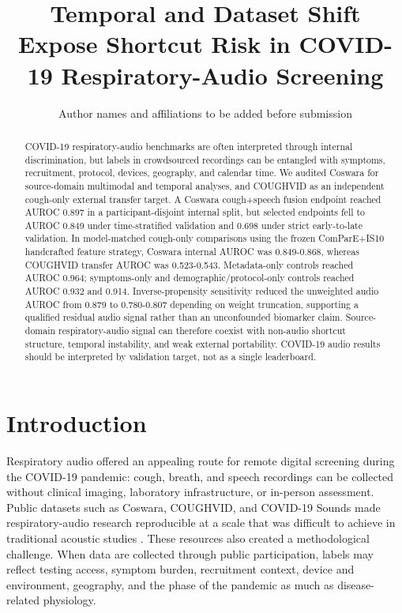 \documentclass[11pt]{article}
\title{Temporal and Dataset Shift Expose Shortcut Risk in COVID-19 Respiratory-Audio Screening}
\author{Author names and affiliations to be added before submission}
\date{}
\begin{document}
\maketitle

\begin{abstract}
COVID-19 respiratory-audio benchmarks are often interpreted through internal discrimination, but labels in crowdsourced recordings can be entangled with symptoms, recruitment, protocol, devices, geography, and calendar time. We audited Coswara for source-domain multimodal and temporal analyses, and COUGHVID as an independent cough-only external transfer target. A Coswara cough+speech fusion endpoint reached AUROC 0.897 in a participant-disjoint internal split, but selected endpoints fell to AUROC 0.849 under time-stratified validation and 0.698 under strict early-to-late validation. In model-matched cough-only comparisons using the frozen ComParE+IS10 handcrafted feature strategy, Coswara internal AUROC was 0.849-0.868, whereas COUGHVID transfer AUROC was 0.523-0.543. Metadata-only controls reached AUROC 0.964; symptoms-only and demographic/protocol-only controls reached AUROC 0.932 and 0.914. Inverse-propensity sensitivity reduced the unweighted audio AUROC from 0.879 to 0.780-0.807 depending on weight truncation, supporting a qualified residual audio signal rather than an unconfounded biomarker claim. Source-domain respiratory-audio signal can therefore coexist with non-audio shortcut structure, temporal instability, and weak external portability. COVID-19 audio results should be interpreted by validation target, not as a single leaderboard.
\end{abstract}

\section*{Introduction}

Respiratory audio offered an appealing route for remote digital screening during the COVID-19 pandemic: cough, breath, and speech recordings can be collected without clinical imaging, laboratory infrastructure, or in-person assessment. Public datasets such as Coswara, COUGHVID, and COVID-19 Sounds made respiratory-audio research reproducible at a scale that was difficult to achieve in traditional acoustic studies \citep{bhattacharya2023coswara,orlandic2021coughvid,xia2021covid}. These resources also created a methodological challenge. When data are collected through public participation, labels may reflect testing access, symptom burden, recruitment context, device and environment, geography, and the phase of the pandemic as much as disease-related physiology.
\end{document}
